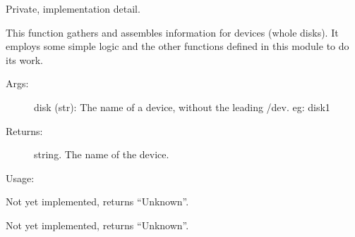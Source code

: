 \documentclass[letterpaper,10pt,english]{sphinxmanual}
\begin{document}
\begin{fulllineitems}
\label{\detokenize{macos:getdevinfo.macos.get_device_info}}
Private, implementation detail.

This function gathers and assembles information for devices (whole disks).
It employs some simple logic and the other functions defined in this
module to do its work.
\begin{description}
\item[{Args:}] \leavevmode
disk (str): The name of a device, without the leading /dev. eg: disk1

\item[{Returns:}] \leavevmode
string.     The name of the device.

\end{description}

Usage:

\begin{sphinxVerbatim}[commandchars=\\\{\}]
  
\end{sphinxVerbatim}

\end{fulllineitems}


\begin{fulllineitems}
\label{\detokenize{macos:getdevinfo.macos.get_file_system}}
Not yet implemented, returns “Unknown”.

\end{fulllineitems}


\begin{fulllineitems}
\label{\detokenize{macos:getdevinfo.macos.get_id}}
Not yet implemented, returns “Unknown”.

\end{fulllineitems}
\end{document}
